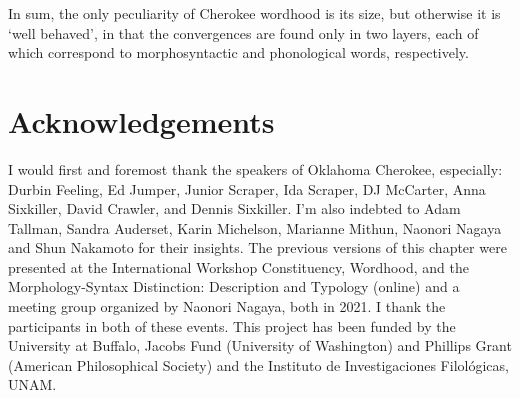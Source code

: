 \documentclass[output=paper]{langscibook}
\begin{document}
In sum, the only peculiarity of Cherokee wordhood is its size, but otherwise it is `well behaved', in that the convergences are found only in two layers, each of which correspond to morphosyntactic and phonological words, respectively. 


\section*{Acknowledgements}
I would first and foremost thank the speakers of Oklahoma Cherokee, especially: Durbin Feeling, Ed Jumper, Junior Scraper, Ida Scraper, DJ McCarter, Anna Sixkiller, David Crawler, and Dennis Sixkiller. I'm also indebted to Adam Tallman, Sandra Auderset, Karin Michelson, Marianne Mithun, Naonori Nagaya and Shun Nakamoto for their insights. The previous versions of this chapter were presented at the International Workshop Constituency, Wordhood, and the Morphol\-ogy-Syntax Distinction: Description and Typology (online) and a meeting group organized by Naonori Nagaya, both in 2021. I thank the participants in both of these events. This project has been funded by the University at Buffalo, Jacobs Fund (University of Washington) and Phillips Grant (American Philosophical Society) and the Instituto de Investigaciones Filológicas, UNAM.


\printglossary

\sloppy\printbibliography[heading=subbibliography,notkeyword=this]
\end{document}
